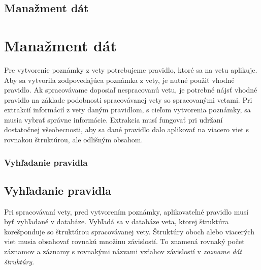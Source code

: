 %
%
{
	\subsection{Manažment dát}
}
{
	\section{Manažment dát}
}
\label{subsection:data_management}
Pre vytvorenie poznámky z vety potrebujeme pravidlo, ktoré sa na vetu aplikuje. Aby sa vytvorila zodpovedajúca poznámka z vety, je nutné použiť vhodné pravidlo. Ak spracovávame doposiaľ nespracovanú vetu, je potrebné nájsť vhodné pravidlo na základe podobnosti spracovávanej vety so spracovanými vetami. Pri extrakcií informácií z vety daným pravidlom, s cieľom vytvorenia poznámky, sa musia vybrať správne informácie. Extrakcia musí fungovať pri udržaní dostatočnej všeobecnosti, aby sa dané pravidlo dalo aplikovať na viacero viet s rovnakou štruktúrou, ale odlišným obsahom.

%
%
{
	\subsubsection{Vyhľadanie pravidla}
}
{
	\subsection{Vyhľadanie pravidla}
}

\label{subsubsection:rule_lookup}
Pri spracovávaní vety, pred vytvorením poznámky, aplikovateľné pravidlo musí byť vyhľadané v databáze. Vyhľadá sa v databáze veta, ktorej štruktúra korešponduje so štruktúrou spracovávanej vety. Štruktúry oboch alebo viacerých viet musia obsahovať rovnakú množinu závislostí. To znamená rovnaký počet záznamov a záznamy s rovnakými názvami vzťahov závislostí v \textit{zozname dát štruktúry}.

